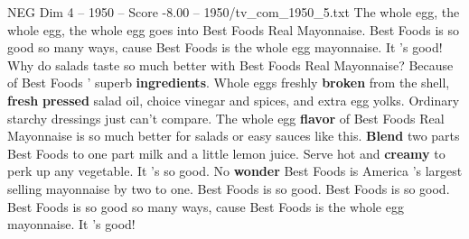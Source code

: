 \begin{textsample}{NEG Dim 4 – 1950 – Score -8.00 – 1950/tv\_com\_1950\_5.txt}  \label{ex:f4_neg_001}
The whole egg, the whole egg, the whole egg goes into Best Foods Real Mayonnaise.
Best Foods is so good so many ways, cause Best Foods is the whole egg mayonnaise.
It 's good!
Why do salads taste so much better with Best Foods Real Mayonnaise?
Because of Best Foods ' superb \textbf{ingredients}.
Whole eggs freshly \textbf{broken} from the shell, \textbf{fresh} \textbf{pressed} salad oil, choice vinegar and spices, and extra egg yolks.
Ordinary starchy dressings just can't compare.
The whole egg \textbf{flavor} of Best Foods Real Mayonnaise is so much better for salads or easy sauces like this. \textbf{Blend} two parts Best Foods to one part milk and a little lemon juice.
Serve hot and \textbf{creamy} to perk up any vegetable.
It 's so good.
No \textbf{wonder} Best Foods is America 's largest selling mayonnaise by two to one.
Best Foods is so good.
Best Foods is so good.
Best Foods is so good so many ways, cause Best Foods is the whole egg mayonnaise.
It 's good!

\end{textsample}
